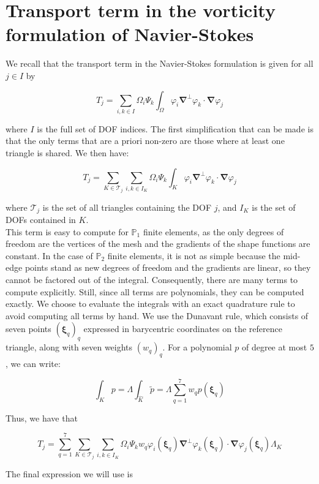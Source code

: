 \documentclass{article}
\theoremstyle{definition}
\theoremstyle{proposition}
\theoremstyle{theorem}
\theoremstyle{remark}
\theoremstyle{corollary}  %
\theoremstyle{exercise}
\theoremstyle{lemma}
\begin{document}
\section{Transport term in the vorticity formulation of Navier-Stokes}

We recall that the transport term in the Navier-Stokes formulation is given for all $j \in I$ by 

$$T_j = \sum_{i, k \in I} \Omega_i\Psi_k \int_{\Omega} \varphi_i \bm \nabla^{\perp} \varphi_k \cdot \bm \nabla \varphi_j$$

where $I$ is the full set of DOF indices. The first simplification that can be made is that the only terms that are a priori non-zero are those where at least one triangle is shared. We then have:

$$T_j = \sum_{K\in \mathcal{T}_j}\sum_{i, k \in I_K} \Omega_i\Psi_k \int_{K} \varphi_i \bm \nabla^{\perp} \varphi_k \cdot \bm \nabla \varphi_j$$

where $\mathcal{T}_j$ is the set of all triangles containing the DOF $j$, and $I_K$ is the set of DOFs contained in $K$.\\

This term is easy to compute for $\mathbb{P}_1$ finite elements, as the only degrees of freedom are the vertices of the mesh and the gradients of the shape functions are constant. In the case of $\mathbb{P}_2$ finite elements, it is not as simple because the mid-edge points stand as new degrees of freedom and the gradients are linear, so they cannot be factored out of the integral. Consequently, there are many terms to compute explicitly. Still, since all terms are polynomials, they can be computed exactly. We choose to evaluate the integrals with an exact quadrature rule to avoid computing all terms by hand. We use the Dunavant rule, which consists of seven points $(\bm \xi_q)_q$ expressed in barycentric coordinates on the reference triangle, along with seven weights $(w_q)_q$. For a polynomial $p$ of degree at most $5$, we can write:

$$\int_{K} p = \Lambda\int_{\hat K} \tilde p =  \Lambda \sum_{q = 1}^7 w_q p(\bm \xi_q)$$


Thus, we have that

$$T_j = \sum_{q =1}^7 \sum_{K\in \mathcal{T}_j}\sum_{i, k \in I_K}  \Omega_i\Psi_k w_q \varphi_i( \bm \xi_q) \bm \nabla^{\perp} \varphi_k ( \bm \xi_q) \cdot \bm \nabla \varphi_j ( \bm \xi_q) \Lambda_K$$

The final expression we will use is 
\end{document}
